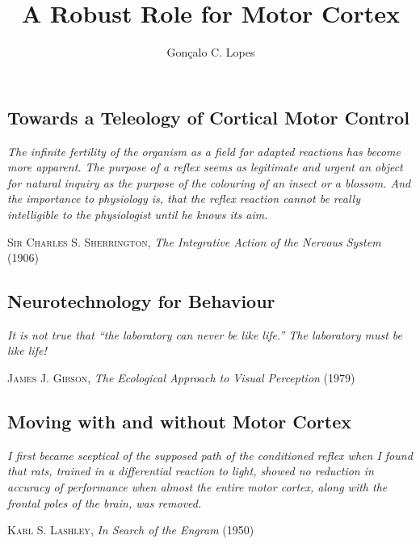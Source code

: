\documentclass[11pt,lot,lof,b5paper]{puthesis}
\title{A Robust Role for Motor Cortex}
\author{Gonçalo C. Lopes}
\let\originalepigraph\epigraph
\renewcommand\epigraph[2]{\originalepigraph{\textit{#1}}{#2}}
\renewcommand{\maketitlepage}{}
\begin{document}
% 
% 



\maketitlepage
\makefrontmatter



\begin{refsection}
\chapter{Towards a Teleology of Cortical Motor Control}
\label{ch:teleology}
\epigraph{The infinite fertility of the organism as a field for adapted reactions has become more apparent. The purpose of a reflex seems as legitimate and urgent an object for natural inquiry as the purpose of the colouring of an insect or a blossom. And the importance to physiology is, that the reflex reaction cannot be really intelligible to the physiologist until he knows its aim.}{\textsc{Sir Charles S. Sherrington}, \textit{The Integrative Action of the Nervous System} (1906)}

\printbibliography[heading=subbibliography]
\end{refsection}

\begin{refsection}
\chapter{Neurotechnology for Behaviour}
\label{ch:tools}
\epigraph{It is not true that ``the laboratory can never be like life.'' The laboratory \emph{must} be like life!}{\textsc{James J. Gibson}, \textit{The Ecological Approach to Visual Perception} (1979)}

\printbibliography[heading=subbibliography]
\end{refsection}

\begin{refsection}
\chapter{Moving with and without Motor Cortex}
\label{ch:behaviour}
\epigraph{I first became sceptical of the supposed path of the conditioned reflex when I found that rats, trained in a differential reaction to light, showed no reduction in accuracy of performance when almost the entire motor cortex, along with the frontal poles of the brain, was removed.}{\textsc{Karl S. Lashley}, \textit{In Search of the Engram} (1950)}

\printbibliography[heading=subbibliography]
\end{refsection}
\end{document}
